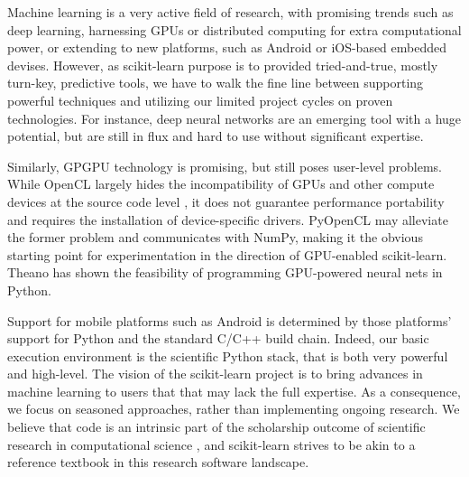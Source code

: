 \documentclass[a4paper]{article}
\begin{document}
Machine learning is a very active field of research, with promising
trends such as deep learning, harnessing GPUs or distributed computing
for extra computational power, or extending to new platforms, such as
Android or iOS-based embedded devises. However, as scikit-learn purpose
is to provided tried-and-true, mostly turn-key, predictive tools, we have
to walk the fine line between supporting powerful techniques and
utilizing our limited project cycles on proven technologies. For
instance, deep neural networks are an emerging tool with a huge
potential, but are still in flux and hard to use without significant expertise.

Similarly, GPGPU technology is promising, but still poses user-level problems.
While OpenCL largely hides the incompatibility of GPUs and other compute devices
at the source code level \cite{stone2010opencl}, it does not guarantee performance portability
and requires the installation of device-specific drivers.
PyOpenCL \cite{klockner2012pycuda} may alleviate the former problem and communicates
with NumPy, making it the obvious starting point for experimentation
in the direction of GPU-enabled scikit-learn. Theano \cite{bergstra2010theano} has
shown the feasibility of programming GPU-powered neural nets in Python.

Support for mobile platforms such as Android is determined by those platforms'
support for Python and the standard C/C++ build chain. Indeed, our basic
execution environment is the scientific Python stack, that is both very
powerful and high-level. The vision of the scikit-learn project is to
bring advances in machine learning to users that that may lack the full
expertise. As a consequence, we focus on seasoned approaches, rather than
implementing ongoing research. We believe that code is an intrinsic part
of the scholarship outcome of scientific research in computational
science \cite{buckheit1995wavelab}, and scikit-learn strives to be akin
to a reference textbook in this research software landscape.





\end{document}
